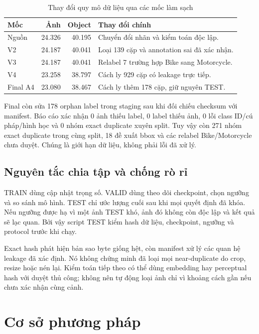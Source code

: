 \documentclass[12pt,a4paper,oneside]{report}
\begin{document}
\begin{table}[H]\centering
\caption{Thay đổi quy mô dữ liệu qua các mốc làm sạch}\label{tab:cleaning}
\begin{tabular}{lrrp{6.1cm}}\toprule
Mốc & Ảnh & Object & Thay đổi chính\\\midrule
Nguồn & 24.326 & 40.195 & Chuyển đổi nhãn và kiểm toán độc lập.\\
V2 & 24.187 & 40.041 & Loại 139 cặp và annotation sai đã xác nhận.\\
V3 & 24.187 & 40.041 & Relabel 7 trường hợp Bike sang Motorcycle.\\
V4 & 23.258 & 38.797 & Cách ly 929 cặp có leakage trực tiếp.\\
Final A4 & 23.080 & 38.467 & Cách ly thêm 178 cặp, giữ nguyên TEST.\\\bottomrule
\end{tabular}
\end{table}

Final còn sửa 178 orphan label trong staging sau khi đối chiếu checksum với manifest. Báo cáo xác nhận 0 ảnh thiếu label, 0 label thiếu ảnh, 0 lỗi class ID/cú pháp/hình học và 0 nhóm exact duplicate xuyên split. Tuy vậy còn 271 nhóm exact duplicate trong cùng split, 18 đề xuất bbox và các relabel Bike/Motorcycle chưa duyệt. Chúng là giới hạn dữ liệu, không phải lỗi đã xử lý.

\section{Nguyên tắc chia tập và chống rò rỉ}
TRAIN dùng cập nhật trọng số. VALID dùng theo dõi checkpoint, chọn ngưỡng và so sánh mô hình. TEST chỉ ước lượng cuối sau khi mọi quyết định đã khóa. Nếu ngưỡng được hạ vì một ảnh TEST khó, ảnh đó không còn độc lập và kết quả sẽ lạc quan. Bởi vậy script TEST kiểm hash dữ liệu, checkpoint, ngưỡng và protocol trước khi chạy.

Exact hash phát hiện bản sao byte giống hệt, còn manifest xử lý các quan hệ leakage đã xác định. Nó không chứng minh đã loại mọi near-duplicate do crop, resize hoặc nén lại. Kiểm toán tiếp theo có thể dùng embedding hay perceptual hash với duyệt thủ công; không nên tự động loại ảnh chỉ vì khoảng cách gần nếu chưa xác nhận cùng cảnh.



\chapter{Cơ sở phương pháp}\label{chap:method}
\end{document}
